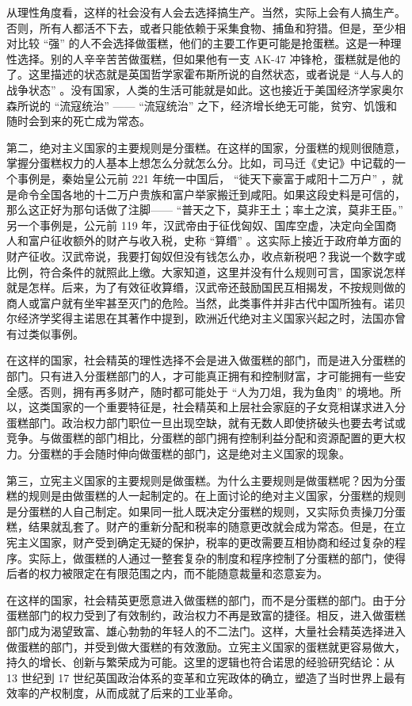 从理性角度看，这样的社会没有人会去选择搞生产。当然，实际上会有人搞生产。否则，所有人都活不下去，或者只能依赖于采集食物、捕鱼和狩猎。但是，至少相对比较 “强” 的人不会选择做蛋糕，他们的主要工作更可能是抢蛋糕。这是一种理性选择。别的人辛辛苦苦做蛋糕，但如果他有一支 AK-47 冲锋枪，蛋糕就是他的了。这里描述的状态就是英国哲学家霍布斯所说的自然状态，或者说是 “人与人的战争状态” 。没有国家，人类的生活可能就是如此。这也接近于美国经济学家奥尔森所说的 “流寇统治” —— “流寇统治” 之下，经济增长绝无可能，贫穷、饥饿和随时会到来的死亡成为常态。

第二，绝对主义国家的主要规则是分蛋糕。在这样的国家，分蛋糕的规则很随意，掌握分蛋糕权力的人基本上想怎么分就怎么分。比如，司马迁《史记》中记载的一个事例是，秦始皇公元前 221 年统一中国后， “徙天下豪富于咸阳十二万户” ，就是命令全国各地的十二万户贵族和富户举家搬迁到咸阳。如果这段史料是可信的，那么这正好为那句话做了注脚—— “普天之下，莫非王土；率土之滨，莫非王臣。” 另一个事例是，公元前 119 年，汉武帝由于征伐匈奴、国库空虚，决定向全国商人和富户征收额外的财产与收入税，史称 “算缗” 。这实际上接近于政府单方面的财产征收。汉武帝说，我要打匈奴但没有钱怎么办，收点新税吧？我说一个数字或比例，符合条件的就照此上缴。大家知道，这里并没有什么规则可言，国家说怎样就是怎样。后来，为了有效征收算缗，汉武帝还鼓励国民互相揭发，不按规则做的商人或富户就有坐牢甚至灭门的危险。当然，此类事件并非古代中国所独有。诺贝尔经济学奖得主诺思在其著作中提到，欧洲近代绝对主义国家兴起之时，法国亦曾有过类似事例。

在这样的国家，社会精英的理性选择不会是进入做蛋糕的部门，而是进入分蛋糕的部门。只有进入分蛋糕部门的人，才可能真正拥有和控制财富，才可能拥有一些安全感。否则，拥有再多财产，随时都可能处于 “人为刀俎，我为鱼肉” 的境地。所以，这类国家的一个重要特征是，社会精英和上层社会家庭的子女竞相谋求进入分蛋糕部门。政治权力部门职位一旦出现空缺，就有无数人即使挤破头也要去考试或竞争。与做蛋糕的部门相比，分蛋糕的部门拥有控制利益分配和资源配置的更大权力。分蛋糕的手会随时伸向做蛋糕的部门，这是绝对主义国家的现象。

第三，立宪主义国家的主要规则是做蛋糕。为什么主要规则是做蛋糕呢？因为分蛋糕的规则是由做蛋糕的人一起制定的。在上面讨论的绝对主义国家，分蛋糕的规则是分蛋糕的人自己制定。如果同一批人既决定分蛋糕的规则，又实际负责操刀分蛋糕，结果就乱套了。财产的重新分配和税率的随意更改就会成为常态。但是，在立宪主义国家，财产受到确定无疑的保护，税率的更改需要互相协商和经过复杂的程序。实际上，做蛋糕的人通过一整套复杂的制度和程序控制了分蛋糕的部门，使得后者的权力被限定在有限范围之内，而不能随意裁量和恣意妄为。

在这样的国家，社会精英更愿意进入做蛋糕的部门，而不是分蛋糕的部门。由于分蛋糕部门的权力受到了有效制约，政治权力不再是致富的捷径。相反，进入做蛋糕部门成为渴望致富、雄心勃勃的年轻人的不二法门。这样，大量社会精英选择进入做蛋糕的部门，并受到做大蛋糕的有效激励。立宪主义国家的蛋糕就更容易做大，持久的增长、创新与繁荣成为可能。这里的逻辑也符合诺思的经验研究结论：从 13 世纪到 17 世纪英国政治体系的变革和立宪政体的确立，塑造了当时世界上最有效率的产权制度，从而成就了后来的工业革命。


